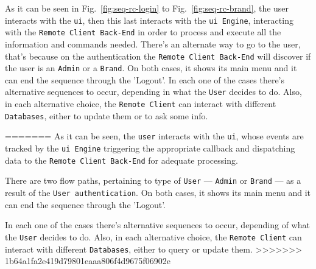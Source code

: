 As it can be seen in Fig.~\ref{fig:seq-rc-login} to Fig.~\ref{fig:seq-rc-brand}, the user interacts with the \texttt{\gls{ui}}, then this last interacts with the \texttt{\gls{ui} Engine}, interacting with the \texttt{Remote Client Back-End} in order to process and execute all the information and commands needed. 
There's an alternate way to go to the user, that's because on the authentication the \texttt{Remote Client Back-End} will discover if the user is an \texttt{Admin} or a \texttt{Brand}.
On both cases, it shows its main menu and it can end the sequence through the 'Logout'.
In each one of the cases there's alternative sequences to occur, depending in what the \texttt{User} decides to do.
Also, in each alternative choice, the \texttt{Remote Client} can interact with different \texttt{Databases}, either to update them or to ask some info.


=======
As it can be seen, the \texttt{user} interacts with the \texttt{\gls{ui}}, whose events
are tracked by the \texttt{\gls{ui} Engine} triggering the appropriate callback
and dispatching data to the \texttt{Remote
  Client Back-End} for adequate processing.

There are two flow paths, pertaining to type of \texttt{User} --- \texttt{Admin}
or \texttt{Brand} --- as a result of the \texttt{User authentication}.
On both cases, it shows its main menu and it can end the sequence through the
'Logout'.

In each one of the cases there's alternative sequences to occur, depending of what the \texttt{User} decides to do.
Also, in each alternative choice, the \texttt{Remote Client} can interact with
different \texttt{Databases}, either to query or update them.
%
>>>>>>> 1b64a1fa2e419d79801eaaa806f4d9675f06902e
